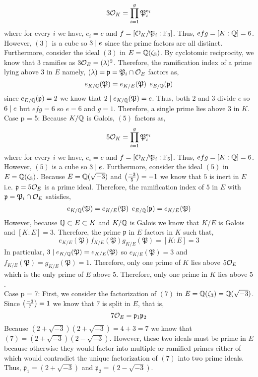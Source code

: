 \documentclass[12pt]{extarticle}
\begin{document}
\begin{enumerate}
\begin{enumerate}
\[ 3 \mathcal{O}_{K} = \prod_{i = 1}^g \mathfrak{P}_i^{e_i}\]
where for every $i$ we have, $e_i = e$ and $f = [\mathcal{O}_{K}/\mathfrak{P}_i : \mathbb{F}_{3}]$. Thus, $efg = [K : \mathbb{Q}] = 6$. However, $(3)$ is a cube so $3 \mid e$ since the prime factors are all distinct. Furthermore, consider the ideal $(3)$ in $E = \mathbb{Q}(\zeta_3)$. By cyclotomic reciprocity, we know that $3$ ramifies as $3 \mathcal{O}_{E} = (\lambda)^2$. Therefore, the ramification index of a prime lying above $3$ in $E$ namely, $(\lambda) = \mathfrak{p} = \mathfrak{P}_i \cap \mathcal{O}_{E}$ factors as,
\[e_{K/\mathbb{Q}}(\mathfrak{P}) = e_{K/E}(\mathfrak{P}) \: \: e_{E/\mathbb{Q}}(\mathfrak{p})\]
since $e_{E/\mathbb{Q}}(\mathfrak{p}) = 2$ we know that $2 \mid e_{K/\mathbb{Q}}(\mathfrak{P}) = e$. Thus, both $2$ and $3$ divide $e$ so $6 \mid e$ but $efg = 6$ so $e = 6$ and $g = 1$. Therefore, a single prime lies above $3$ in $K$. 
\bigskip \\
Case p = 5: Because $K/\mathbb{Q}$ is Galois, $(5)$ factors as,
\[ 5 \mathcal{O}_{K} = \prod_{i = 1}^g \mathfrak{P}_i^{e_i}\]
where for every $i$ we have, $e_i = e$ and $f = [\mathcal{O}_{K}/\mathfrak{P}_i : \mathbb{F}_{5}]$. Thus, $efg = [K : \mathbb{Q}] = 6$. However, $(5)$ is a cube so $3 \mid e$. Furthermore, consider the ideal $(5)$ in $E = \mathbb{Q}(\zeta_3)$. Because $E = \mathbb{Q}(\sqrt{-3})$ and $\left(\frac{-3}{5} \right) = -1$ we know that $5$ is inert in $E$ i.e. $\mathfrak{p} = 5 \mathcal{O}_{E}$ is a prime ideal. Therefore, the ramification index of $5$ in $E$ with $ \mathfrak{p} = \mathfrak{P}_i \cap \mathcal{O}_{E}$ satisfies,
\[e_{K/\mathbb{Q}}(\mathfrak{P}) = e_{K/E}(\mathfrak{P}) \: \: e_{E/\mathbb{Q}}(\mathfrak{p}) = e_{K/E}(\mathfrak{P})\]
However, because $\mathbb{Q} \subset E \subset K$ and $K/\mathbb{Q}$ is Galois we know that $K/E$ is Galois and $[K : E] = 3$. Therefore, the prime $\mathfrak{p}$ in $E$ factors in $K$ such that,
\[e_{K/E}(\mathfrak{P}) f_{K/E}(\mathfrak{P}) g_{K/E}(\mathfrak{P}) = [K : E] = 3\]
In particular, $3 \mid e_{K/\mathbb{Q}}(\mathfrak{P}) =  e_{K/E}(\mathfrak{P})$ so $e_{K/E}(\mathfrak{P}) = 3$ and $f_{K/E}(\mathfrak{P}) = g_{K/E}(\mathfrak{P}) = 1$. Therefore, only one prime of $K$ lies above $5\mathcal{O}_{E}$ which is the only prime of $E$ above $5$. Therefore, only one prime in $K$ lies above $5$. 
\bigskip \\
Case p = 7: First, we consider the factorization of $(7)$ in $E = \mathbb{Q}(\zeta_3) = \mathbb{Q}(\sqrt{-3})$. Since $\left(\frac{-3}{7} \right) = 1$ we know that $7$ is split in $E$, that is,
\[7 \mathcal{O}_{E} = \mathfrak{p}_1 \mathfrak{p}_2\] 
Because $(2 + \sqrt{-3})(2 + \sqrt{-3}) = 4 + 3 = 7$ we know that $(7) = (2 + \sqrt{-3})(2 - \sqrt{-3})$. However, these two ideals must be prime in $E$ because otherwise they would factor into multiple or ramified primes either of which would contradict the unique factorization of $(7)$ into two prime ideals. Thus, $\mathfrak{p}_1 = (2 + \sqrt{-3})$ and $\mathfrak{p}_2 = (2 - \sqrt{-3})$. 

\end{enumerate}
\end{enumerate}
\end{document}
